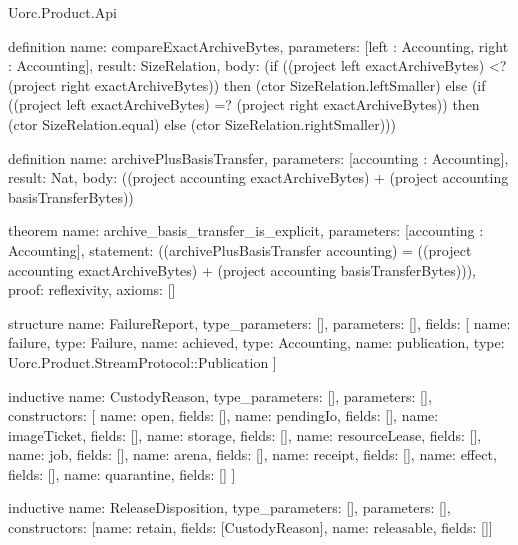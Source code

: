 \begin{lexlean}{Uorc.Product.Api}
\begin{semanticmodule}
definition{
  name: compareExactArchiveBytes,
  parameters: [left : Accounting, right : Accounting],
  result: SizeRelation,
  body: (if ((project left exactArchiveBytes) <? (project right exactArchiveBytes)) then (ctor SizeRelation.leftSmaller) else (if ((project left exactArchiveBytes) =? (project right exactArchiveBytes)) then (ctor SizeRelation.equal) else (ctor SizeRelation.rightSmaller)))
}

definition{
  name: archivePlusBasisTransfer,
  parameters: [accounting : Accounting],
  result: Nat,
  body: ((project accounting exactArchiveBytes) + (project accounting basisTransferBytes))
}

theorem{
  name: archive_basis_transfer_is_explicit,
  parameters: [accounting : Accounting],
  statement: ((archivePlusBasisTransfer accounting) = ((project accounting exactArchiveBytes) + (project accounting basisTransferBytes))),
  proof: reflexivity{},
  axioms: []
}

structure{
  name: FailureReport,
  type_parameters: [],
  parameters: [],
  fields: [
    {name: failure, type: Failure},
    {name: achieved, type: Accounting},
    {name: publication, type: Uorc.Product.StreamProtocol::Publication}
  ]
}

inductive{
  name: CustodyReason,
  type_parameters: [],
  parameters: [],
  constructors: [
    {name: open, fields: []},
    {name: pendingIo, fields: []},
    {name: imageTicket, fields: []},
    {name: storage, fields: []},
    {name: resourceLease, fields: []},
    {name: job, fields: []},
    {name: arena, fields: []},
    {name: receipt, fields: []},
    {name: effect, fields: []},
    {name: quarantine, fields: []}
  ]
}

inductive{
  name: ReleaseDisposition,
  type_parameters: [],
  parameters: [],
  constructors: [{name: retain, fields: [CustodyReason]}, {name: releasable, fields: []}]
}
\end{semanticmodule}
\end{lexlean}
